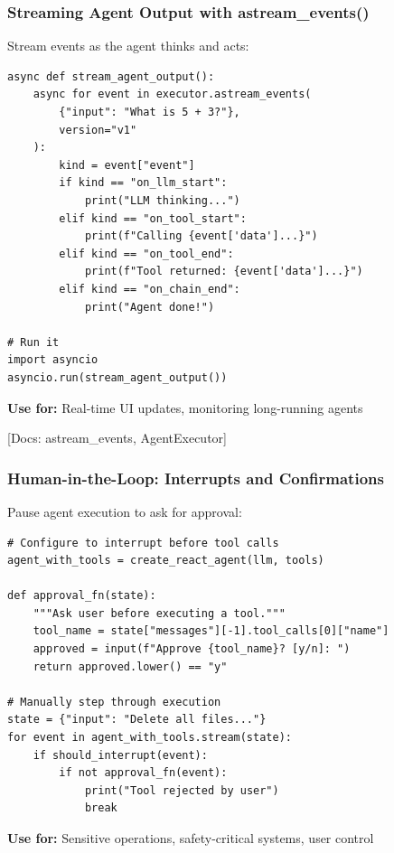 \documentclass[aspectratio=169,11pt]{beamer}
\newcommand{\docref}[1]{{\scriptsize\color{docgray}[Docs: #1]}}
\begin{document}
\begin{frame}[fragile]
\frametitle{Streaming Agent Output with astream\_events()}

Stream events as the agent thinks and acts:

\vspace{0.3cm}

\begin{lstlisting}
async def stream_agent_output():
    async for event in executor.astream_events(
        {"input": "What is 5 + 3?"},
        version="v1"
    ):
        kind = event["event"]
        if kind == "on_llm_start":
            print("LLM thinking...")
        elif kind == "on_tool_start":
            print(f"Calling {event['data']...}")
        elif kind == "on_tool_end":
            print(f"Tool returned: {event['data']...}")
        elif kind == "on_chain_end":
            print("Agent done!")

# Run it
import asyncio
asyncio.run(stream_agent_output())
\end{lstlisting}

\vspace{0.3cm}

\textbf{Use for:} Real-time UI updates, monitoring long-running agents

\docref{astream\_events, AgentExecutor}

\end{frame}

\begin{frame}[fragile]
\frametitle{Human-in-the-Loop: Interrupts and Confirmations}

Pause agent execution to ask for approval:

\vspace{0.3cm}

\begin{lstlisting}
# Configure to interrupt before tool calls
agent_with_tools = create_react_agent(llm, tools)

def approval_fn(state):
    """Ask user before executing a tool."""
    tool_name = state["messages"][-1].tool_calls[0]["name"]
    approved = input(f"Approve {tool_name}? [y/n]: ")
    return approved.lower() == "y"

# Manually step through execution
state = {"input": "Delete all files..."}
for event in agent_with_tools.stream(state):
    if should_interrupt(event):
        if not approval_fn(event):
            print("Tool rejected by user")
            break
\end{lstlisting}

\vspace{0.3cm}

\textbf{Use for:} Sensitive operations, safety-critical systems, user control

\end{frame}
\end{document}
